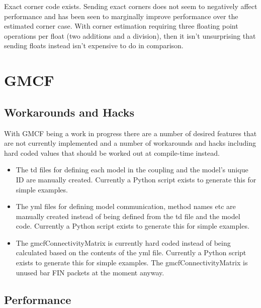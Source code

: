 \documentclass{article}
\begin{document}
Exact corner code exists. Sending exact corners does not seem to negatively
affect performance and has been seen to marginally improve performance over the
estimated corner case. With corner estimation requiring three floating point
operations per float (two additions and a division), then it isn't unsurprising
that sending floats instead isn't expensive to do in comparison.

\section{GMCF}

\subsection{Workarounds and Hacks}

With GMCF being a work in progress there are a number of desired features that
are not currently implemented and a number of workarounds and hacks including
hard coded values that should be worked out at compile-time instead.

\begin{itemize}

    \item The td files for defining each model in the coupling and the model's
    unique ID are manually created. Currently a Python script exists to generate
    this for simple examples.

    \item The yml files for defining model communication, method names etc are
    manually created instead of being defined from the td file and the model
    code. Currently a Python script exists to generate this for simple examples.

    \item The gmcfConnectivityMatrix is currently hard coded instead of being
    calculated based on the contents of the yml file. Currently a Python script
    exists to generate this for simple examples. The gmcfConnectivityMatrix is
    unused bar FIN packets at the moment anyway.

\end{itemize}

\subsection{Performance}
\end{document}
